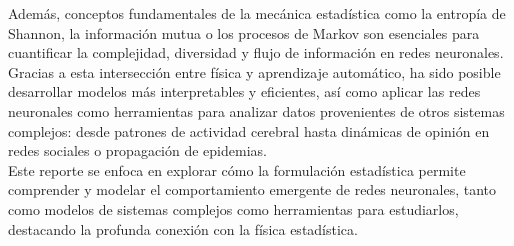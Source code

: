 Además, conceptos fundamentales de la mecánica estadística como la entropía de Shannon, la información mutua o los procesos de Markov son esenciales para cuantificar la complejidad, diversidad y flujo de información en redes neuronales. Gracias a esta intersección entre física y aprendizaje automático, ha sido posible desarrollar modelos más interpretables y eficientes, así como aplicar las redes neuronales como herramientas para analizar datos provenientes de otros sistemas complejos: desde patrones de actividad cerebral hasta dinámicas de opinión en redes sociales o propagación de epidemias.\\

Este reporte se enfoca en explorar cómo la formulación estadística permite comprender y modelar el comportamiento emergente de redes neuronales, tanto como modelos de sistemas complejos como herramientas para estudiarlos, destacando la profunda conexión con la física estadística.
